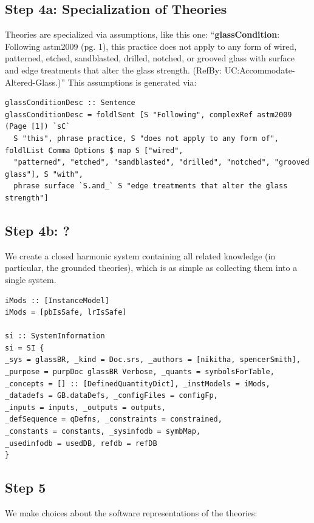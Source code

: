 \documentclass[sigconf,review]{acmart}
\begin{document}
\subsection*{Step 4a: Specialization of Theories}

Theories are specialized via assumptions, like this one: ``\textbf{glassCondition}:
Following astm2009 (pg. 1), this practice does not apply to any form of wired,
patterned, etched, sandblasted, drilled, notched, or grooved glass with surface
and edge treatments that alter the glass strength. (RefBy:
UC:Accommodate-Altered-Glass.)''  This assumptions is generated via:

\begin{lstlisting}
glassConditionDesc :: Sentence
glassConditionDesc = foldlSent [S "Following", complexRef astm2009 (Page [1]) `sC` 
  S "this", phrase practice, S "does not apply to any form of", foldlList Comma Options $ map S ["wired",
  "patterned", "etched", "sandblasted", "drilled", "notched", "grooved glass"], S "with", 
  phrase surface `S.and_` S "edge treatments that alter the glass strength"]
\end{lstlisting}

\subsection*{Step 4b: ?}

We create a closed harmonic system containing all related knowledge (in
particular, the grounded theories), which is as simple as collecting them into a
single system.

\begin{lstlisting}
iMods :: [InstanceModel]
iMods = [pbIsSafe, lrIsSafe]

si :: SystemInformation
si = SI {
_sys = glassBR, _kind = Doc.srs, _authors = [nikitha, spencerSmith],
_purpose = purpDoc glassBR Verbose, _quants = symbolsForTable,
_concepts = [] :: [DefinedQuantityDict], _instModels = iMods,
_datadefs = GB.dataDefs, _configFiles = configFp,
_inputs = inputs, _outputs = outputs,
_defSequence = qDefns, _constraints = constrained,
_constants = constants, _sysinfodb = symbMap,
_usedinfodb = usedDB, refdb = refDB
}
\end{lstlisting}

\subsection*{Step 5}

We make choices about the software representations of the theories:
\end{document}
